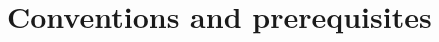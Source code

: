 \documentclass[11pt]{amsart}
\theoremstyle{definition}
\newcommand{\Q}{{\mathbb{Q}}}
\newcommand{\Operad}{\mathrm{Operad}}
\newcommand{\PL}{\mathrm{PL}}
\newcommand{\GG}{\mathrm{G}}
\numberwithin{equation}{section}
\begin{document}
%









\section{Conventions and prerequisites}\label{s:conv}
\end{document}
